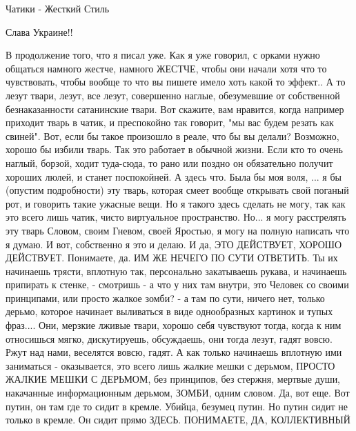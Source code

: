  
 
 
 
 


Чатики - Жесткий Стиль

Слава Украине!! 💛 💙 💛 💙 💛 💙 💛 💙

В продолжение того, что я писал уже. Как я уже говорил, с орками нужно общаться
намного жестче, намного ЖЕСТЧЕ, чтобы они начали хотя что то чувствовать, чтобы
вообще то что вы пишете имело хоть какой то эффект.. А то лезут твари, лезут,
все лезут, совершенно наглые, обезумевшие от собственной безнаказанности
сатанинские твари. Вот скажите, вам нравится, когда например приходит тварь в
чатик, и преспокойно так говорит, "мы вас будем резать как свиней". Вот, если
бы такое произошло в реале, что бы вы делали? Возможно, хорошо бы избили тварь.
Так это работает в обычной жизни. Если кто то очень наглый, борзой, ходит
туда-сюда, то рано или поздно он обязательно получит хороших люлей, и станет
поспокойней. А здесь что. Была бы моя воля, ... я бы (опустим подробности) эту
тварь, которая смеет вообще открывать свой поганый рот, и говорить такие
ужасные вещи. Но я такого здесь сделать не могу, так как это всего лишь чатик,
чисто виртуальное пространство. Но... я могу расстрелять эту тварь Словом,
своим Гневом, своей Яростью, я могу на полную написать что я думаю. И вот,
собственно я это и делаю. И да, ЭТО ДЕЙСТВУЕТ, ХОРОШО ДЕЙСТВУЕТ. Понимаете, да.
ИМ ЖЕ НЕЧЕГО ПО СУТИ ОТВЕТИТЬ. Ты их начинаешь трясти, вплотную так,
персонально закатываешь рукава, и начинаешь припирать к стенке, - смотришь - а
что у них там внутри, это Человек со своими принципами, или просто жалкое
зомби? - а там по сути, ничего нет, только дерьмо, которое начинает выливаться
в виде однообразных картинок и тупых фраз.... Они, мерзкие лживые твари, хорошо
себя чувствуют тогда, когда к ним относишься мягко, дискутируешь, обсуждаешь,
они тогда лезут, гадят вовсю. Ржут над нами, веселятся вовсю, гадят. А как
только начинаешь вплотную ими заниматься - оказывается, это всего лишь жалкие
мешки с дерьмом, ПРОСТО ЖАЛКИЕ МЕШКИ С ДЕРЬМОМ, без принципов, без стержня,
мертвые души, накачанные информационным дерьмом, ЗОМБИ, одним словом. Да, вот
еще. Вот путин, он там где то сидит в кремле. Убийца, безумец путин. Но путин
сидит не только в кремле. Он сидит прямо ЗДЕСЬ. ПОНИМАЕТЕ, ДА, КОЛЛЕКТИВНЫЙ
